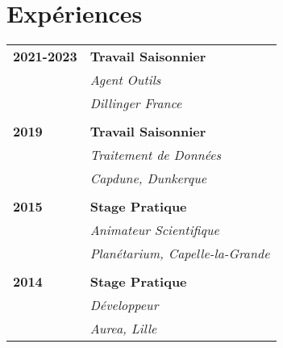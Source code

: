 \documentclass[a4paper, 12pt]{article}
\begin{document}
\begin{minipage}[t]{0.65\textwidth}
    \section*{\textcolor{sectioncolor}{Expériences}}
    \begin{tabular}{ m{} m{} }
        \textbf{2021-2023} & \textbf{Travail Saisonnier} \\
        & \textit{Agent Outils} \\
        & \textit{Dillinger France} \\
        & \\
        \textbf{2019} & \textbf{Travail Saisonnier} \\
        & \textit{Traitement de Données} \\
        & \textit{Capdune, Dunkerque} \\
        & \\
        \textbf{2015} & \textbf{Stage Pratique} \\
        & \textit{Animateur Scientifique} \\
        & \textit{Planétarium, Capelle-la-Grande} \\
        & \\
        \textbf{2014} & \textbf{Stage Pratique} \\
        & \textit{Développeur} \\
        & \textit{Aurea, Lille} \\
    \end{tabular}

\end{minipage}
\end{document}
